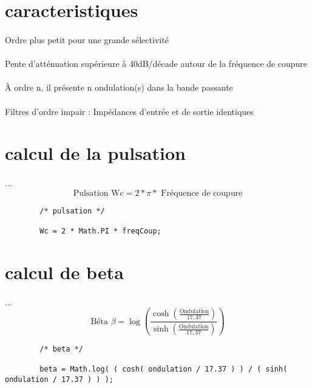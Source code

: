 \documentclass[a4paper,11pt]{article}
\begin{document}
\section{caracteristiques}
    \paragraph{}
Ordre plus petit pour une grande sélectivité
    \paragraph{}
Pente d’atténuation supérieure à 40dB/décade autour de la fréquence de coupure
    \paragraph{}
À ordre n, il présente n ondulation(s) dans la bande passante
    \paragraph{}
Filtres d’ordre impair : Impédances d’entrée et de sortie identiques

\section{calcul de la pulsation}
    \paragraph{}
    ...\[ \mbox{Pulsation Wc} = 2 * \pi * \mbox{ Fréquence de coupure}\]
    \begin{lstlisting}
        /* pulsation */

        Wc = 2 * Math.PI * freqCoup;

    \end{lstlisting}

\section{calcul de beta}
    \paragraph{}
    ...\[ \mbox{Béta } \beta = \log( \frac{ \cosh( \frac{ \mbox{Ondulation} }{17,37} ) } { \sinh( \frac{ \mbox{Ondulation} }{17,37} ) } )\]
    \begin{lstlisting}
        /* beta */

        beta = Math.log( ( cosh( ondulation / 17.37 ) ) / ( sinh( ondulation / 17.37 ) ) );

    \end{lstlisting}
\end{document}
